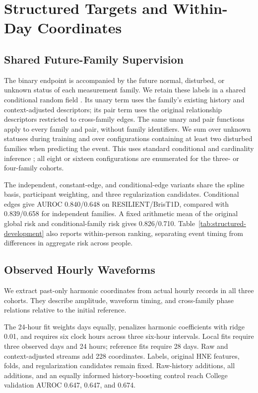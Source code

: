 \section{Structured Targets and Within-Day Coordinates}

\subsection{Shared Future-Family Supervision}
The binary endpoint is accompanied by the future normal, disturbed, or unknown status of each measurement family. We retain these labels in a shared conditional random field \citep{hneC06}. Its unary term uses the family's existing history and context-adjusted descriptors; its pair term uses the original relationship descriptors restricted to cross-family edges. The same unary and pair functions apply to every family and pair, without family identifiers. We sum over unknown statuses during training and over configurations containing at least two disturbed families when predicting the event. This uses standard conditional and cardinality inference \citep{hneC05}; all eight or sixteen configurations are enumerated for the three- or four-family cohorts.

The independent, constant-edge, and conditional-edge variants share the spline basis, participant weighting, and three regularization candidates. Conditional edges give AUROC 0.840/0.648 on RESILIENT/BrisT1D, compared with 0.839/0.658 for independent families. A fixed arithmetic mean of the original global risk and conditional-family risk gives 0.826/0.710. Table~\ref{tab:structured-development} also reports within-person ranking, separating event timing from differences in aggregate risk across people.

\subsection{Observed Hourly Waveforms}
We extract past-only harmonic coordinates \citep{hneC07} from actual hourly records in all three cohorts. They describe amplitude, waveform timing, and cross-family phase relations relative to the initial reference.

The 24-hour fit weights days equally, penalizes harmonic coefficients with ridge 0.01, and requires six clock hours across three six-hour intervals. Local fits require three observed days and 24 hours; reference fits require 28 days. Raw and context-adjusted streams add 228 coordinates. Labels, original HNE features, folds, and regularization candidates remain fixed. Raw-history additions, all additions, and an equally informed history-boosting control reach College validation AUROC 0.647, 0.647, and 0.674.

